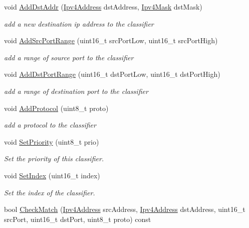 \begin{DoxyCompactItemize}
void \hyperlink{classns3_1_1IpcsClassifierRecord_a69ec3e61c727e9995fe7b148f84b8dff}{Add\+Dst\+Addr} (\hyperlink{classns3_1_1Ipv4Address}{Ipv4\+Address} dst\+Address, \hyperlink{classns3_1_1Ipv4Mask}{Ipv4\+Mask} dst\+Mask)
\begin{DoxyCompactList}\small\item\em add a new destination ip address to the classifier \end{DoxyCompactList}\item 
void \hyperlink{classns3_1_1IpcsClassifierRecord_a9678d242143b031e0f4c22bcdec17b56}{Add\+Src\+Port\+Range} (uint16\+\_\+t src\+Port\+Low, uint16\+\_\+t src\+Port\+High)
\begin{DoxyCompactList}\small\item\em add a range of source port to the classifier \end{DoxyCompactList}\item 
void \hyperlink{classns3_1_1IpcsClassifierRecord_adc2ea9aef9e0a3d57e4522698721ad7e}{Add\+Dst\+Port\+Range} (uint16\+\_\+t dst\+Port\+Low, uint16\+\_\+t dst\+Port\+High)
\begin{DoxyCompactList}\small\item\em add a range of destination port to the classifier \end{DoxyCompactList}\item 
void \hyperlink{classns3_1_1IpcsClassifierRecord_af1a805afc2c131b82ef0ecc67d1f3b0d}{Add\+Protocol} (uint8\+\_\+t proto)
\begin{DoxyCompactList}\small\item\em add a protocol to the classifier \end{DoxyCompactList}\item 
void \hyperlink{classns3_1_1IpcsClassifierRecord_a0567d8e5ad76fa9563e25f6ab943930f}{Set\+Priority} (uint8\+\_\+t prio)
\begin{DoxyCompactList}\small\item\em Set the priority of this classifier. \end{DoxyCompactList}\item 
void \hyperlink{classns3_1_1IpcsClassifierRecord_a64644e1b13a8f10c7ee4d90dc36e0cd1}{Set\+Index} (uint16\+\_\+t index)
\begin{DoxyCompactList}\small\item\em Set the index of the classifier. \end{DoxyCompactList}\item 
bool \hyperlink{classns3_1_1IpcsClassifierRecord_ad11e2dc1f66d5238281975bfd4da5180}{Check\+Match} (\hyperlink{classns3_1_1Ipv4Address}{Ipv4\+Address} src\+Address, \hyperlink{classns3_1_1Ipv4Address}{Ipv4\+Address} dst\+Address, uint16\+\_\+t src\+Port, uint16\+\_\+t dst\+Port, uint8\+\_\+t proto) const 

\end{DoxyCompactItemize}
